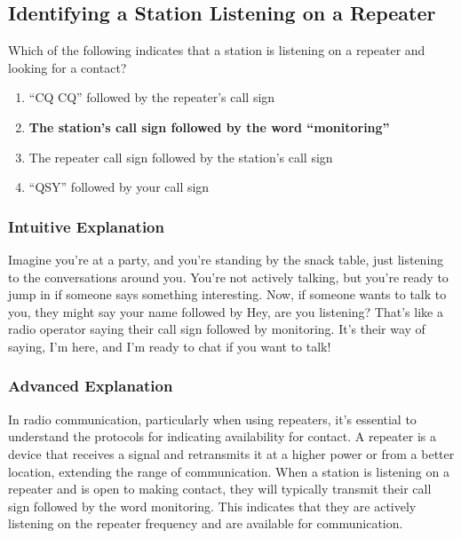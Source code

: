 \subsection{Identifying a Station Listening on a Repeater}
\label{T2A09}

\begin{tcolorbox}[colback=gray!10!white,colframe=black!75!black,title=T2A09]
Which of the following indicates that a station is listening on a repeater and looking for a contact?
\begin{enumerate}[label=\Alph*]
    \item “CQ CQ” followed by the repeater’s call sign
    \item \textbf{The station’s call sign followed by the word “monitoring”}
    \item The repeater call sign followed by the station’s call sign
    \item “QSY” followed by your call sign
\end{enumerate}
\end{tcolorbox}

\subsubsection{Intuitive Explanation}
Imagine you're at a party, and you're standing by the snack table, just listening to the conversations around you. You're not actively talking, but you're ready to jump in if someone says something interesting. Now, if someone wants to talk to you, they might say your name followed by Hey, are you listening? That's like a radio operator saying their call sign followed by monitoring. It’s their way of saying, I’m here, and I’m ready to chat if you want to talk!

\subsubsection{Advanced Explanation}
In radio communication, particularly when using repeaters, it's essential to understand the protocols for indicating availability for contact. A repeater is a device that receives a signal and retransmits it at a higher power or from a better location, extending the range of communication. When a station is listening on a repeater and is open to making contact, they will typically transmit their call sign followed by the word monitoring. This indicates that they are actively listening on the repeater frequency and are available for communication.

